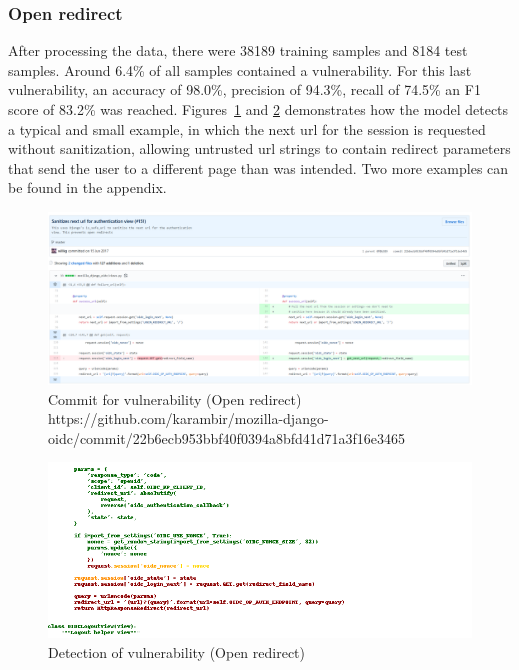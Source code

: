 \documentclass[
a4paper,
pagesize,
pdftex,
12pt,
twoside, %
BCOR=5mm, %
ngerman,
fleqn,
final,
]{scrartcl}
\begin{document}
	
	\subsubsection{Open redirect}
	After processing the data, there were 38189 training samples and 8184 test samples. Around 6.4\% of all samples contained a vulnerability. For this last vulnerability, an accuracy of 98.0\%, precision of 94.3\%, recall of 74.5\% an F1 score of 83.2\% was reached. Figures~\ref{fig:open_redirectA} and \ref{fig:open_redirectAr} demonstrates how the model detects a typical and small example, in which the next url for the session is requested without sanitization, allowing untrusted url strings to contain redirect parameters that send the user to a different page than was intended. Two more examples can be found in the appendix.
		
	\begin{figure}[H]
		\centering
		\includegraphics[width=\linewidth]{Images/open_redirectA}
		\caption{Commit for vulnerability (Open redirect) \newline \scriptsize{
				https://github.com/karambir/mozilla-django-oidc/commit/22b6ecb953bbf40f0394a8bfd41d71a3f16e3465}}
		\label{fig:open_redirectA}
	\end{figure}
	\begin{figure}[H]
		\centering
		\includegraphics[width=\linewidth]{Images/open_redirectAr}
		\caption{Detection of vulnerability (Open redirect)}
		\label{fig:open_redirectAr}
	\end{figure}
	\newpage
\end{document}
